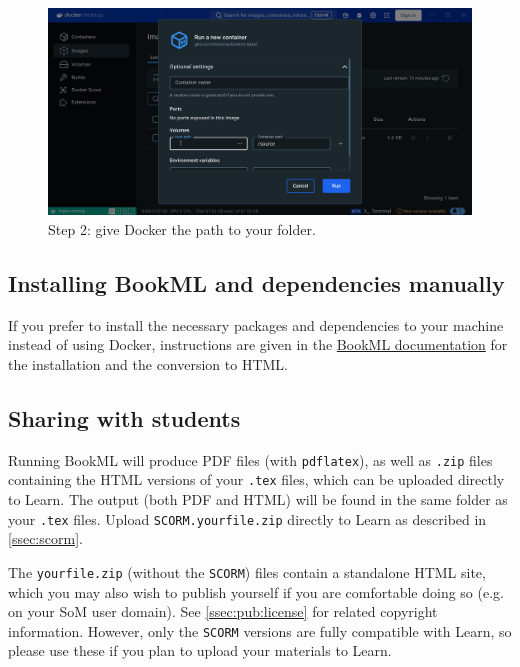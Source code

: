 \begin{figure}[h!]
    \centering
    \includegraphics[width=\textwidth]{img/docker_desktop_path.png}
    \caption{Step 2: give Docker the path to your folder.}
    \label{fig:docker_desktop_path}
\end{figure}

\subsection{Installing BookML and dependencies manually}
\label{ssec:install}

If you prefer to install the necessary packages and dependencies to your machine instead of using Docker, instructions are given in the \href{https://vlmantova.github.io/bookmlleeds/#S1}{BookML documentation} for the installation and the conversion to HTML.


\subsection{Sharing with students}
\label{ssec:local:share}

Running BookML will produce PDF files (with \verb|pdflatex|), as well as \verb|.zip| files containing the HTML versions of your \verb|.tex| files, which can be uploaded directly to Learn. The output (both PDF and HTML) will be found in the same folder as your \verb|.tex| files.
Upload \verb|SCORM.yourfile.zip| directly to Learn as described in \ref{ssec:scorm}.

The \verb|yourfile.zip| (without the \verb|SCORM|) files contain a standalone HTML site, which you may also wish to publish yourself if you are comfortable doing so (e.g. on your SoM user domain). See \ref{ssec:pub:license} for related copyright information. However, only the \verb|SCORM| versions are fully compatible with Learn, so please use these if you plan to upload your materials to Learn.


